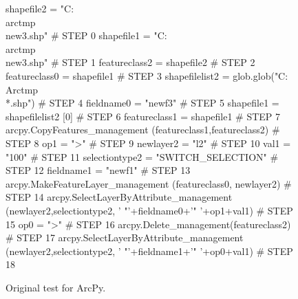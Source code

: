 \begin{figure}[t]
{\scriptsize 
\begin{code}
shapefile2 = "C:\\arctmp\\new3.shp"                \# STEP 0 
shapefile1 = "C:\\arctmp\\new3.shp"                \# STEP 1
featureclass2 = shapefile2                       \# STEP 2
featureclass0 = shapefile1                       \# STEP 3
shapefilelist2 = 
   glob.glob("C:\\Arctmp\\*.shp")                  \# STEP 4
fieldname0 = "newf3"                             \# STEP 5
shapefile1 = shapefilelist2 [0]                  \# STEP 6
featureclass1 = shapefile1                       \# STEP 7
arcpy.CopyFeatures\_management
   (featureclass1,featureclass2)                 \# STEP 8
op1 = ">"                                        \# STEP 9
newlayer2 = "l2"                                 \# STEP 10
val1 = "100"                                     \# STEP 11
selectiontype2 = "SWITCH\_SELECTION"              \# STEP 12
fieldname1 = "newf1"                             \# STEP 13
arcpy.MakeFeatureLayer\_management
   (featureclass0, newlayer2)                    \# STEP 14
arcpy.SelectLayerByAttribute\_management
   (newlayer2,selectiontype2,
   ' "'+fieldname0+'" '+op1+val1)                \# STEP 15
op0 = ">"                                        \# STEP 16
arcpy.Delete\_management(featureclass2)           \# STEP 17
arcpy.SelectLayerByAttribute\_management
   (newlayer2,selectiontype2,
   ' "'+fieldname1+'" '+op0+val1)                \# STEP 18
\end{code}
}
\caption{Original test for ArcPy.}
\label{esriorig}
\end{figure}

